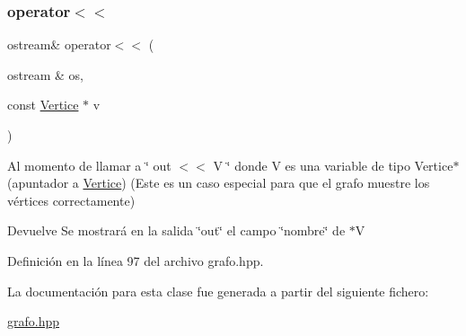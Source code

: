 \subsubsection{\texorpdfstring{operator$<$$<$}{operator<<}\hspace{0.1cm}{\footnotesize\ttfamily [2/2]}}
{\footnotesize\ttfamily ostream\& operator$<$$<$ (\begin{DoxyParamCaption}\item[{ostream \&}]{os,  }\item[{const \hyperlink{classVertice}{Vertice} $\ast$}]{v }\end{DoxyParamCaption})\hspace{0.3cm}{\ttfamily [friend]}}



Al momento de llamar a \char`\"{} out $<$$<$ V \char`\"{} donde V es una variable de tipo Vertice$\ast$ (apuntador a \hyperlink{classVertice}{Vertice}) (Este es un caso especial para que el grafo muestre los vértices correctamente) 

\begin{DoxyReturn}{Devuelve}
Se mostrará en la salida \char`\"{}out\char`\"{} el campo \char`\"{}nombre\char`\"{} de $\ast$V 
\end{DoxyReturn}


Definición en la línea 97 del archivo grafo.\+hpp.



La documentación para esta clase fue generada a partir del siguiente fichero\+:\begin{DoxyCompactItemize}
\item 
\hyperlink{grafo_8hpp}{grafo.\+hpp}\end{DoxyCompactItemize}
